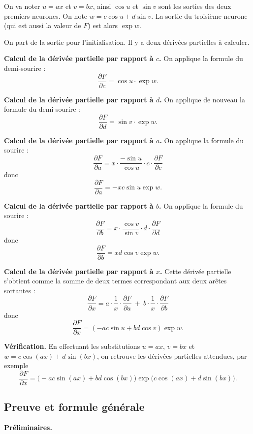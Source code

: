 On va noter $u=ax$ et $v=bx$, ainsi $\cos u$ et $\sin v$ sont les sorties des deux premiers neurones. On note $w =c\cos u + d\sin v$. La sortie du troisième neurone (qui est aussi la valeur de $F$) est alors $\exp w$.

On part de la sortie pour l'initialisation. Il y a deux dérivées partielles à calculer.

\textbf{Calcul de la dérivée partielle par rapport à $c$.}
On applique la formule du demi-sourire :
$$\frac{\partial F}{\partial c} = \cos u \cdot \exp w.$$

\textbf{Calcul de la dérivée partielle par rapport à $d$.}
On applique de nouveau la formule du demi-sourire :
$$\frac{\partial F}{\partial d} = \sin v \cdot \exp w.$$

\textbf{Calcul de la dérivée partielle par rapport à $a$.}
On applique la formule du sourire :
$$\frac{\partial F}{\partial a} = x \cdot \frac{-\sin u}{\cos u} \cdot c \cdot  \frac{\partial F}{\partial c}$$
donc 
$$\frac{\partial F}{\partial a} = -x c \sin u \exp w.$$

\textbf{Calcul de la dérivée partielle par rapport à $b$.}
On applique la formule du sourire :
$$\frac{\partial F}{\partial b} = x \cdot \frac{\cos v}{\sin v} \cdot d \cdot  \frac{\partial F}{\partial d}$$
donc 
$$\frac{\partial F}{\partial b} = x d \cos v \exp w.$$

\textbf{Calcul de la dérivée partielle par rapport à $x$.}
Cette dérivée partielle s'obtient comme la somme de deux termes correspondant aux deux arêtes sortantes :
$$\frac{\partial F}{\partial x} = a \cdot \frac{1}{x} \cdot \frac{\partial F}{\partial a} \ + \  b \cdot \frac{1}{x} \cdot \frac{\partial F}{\partial b}$$
donc 
$$\frac{\partial F}{\partial x} = (-ac\sin u + bd\cos v) \exp w.$$

\textbf{Vérification.}
En effectuant les substitutions $u=ax$, $v=bx$ et $w =c\cos (ax) + d\sin (bx)$,
on retrouve les dérivées partielles attendues, par exemple
$$\frac{\partial F}{\partial x} = \big(-ac\sin (ax) + bd\cos (bx) \big) \exp \big(c\cos (ax) + d\sin (bx) \big).$$

\subsection{Preuve et formule générale}


\textbf{Préliminaires.}

